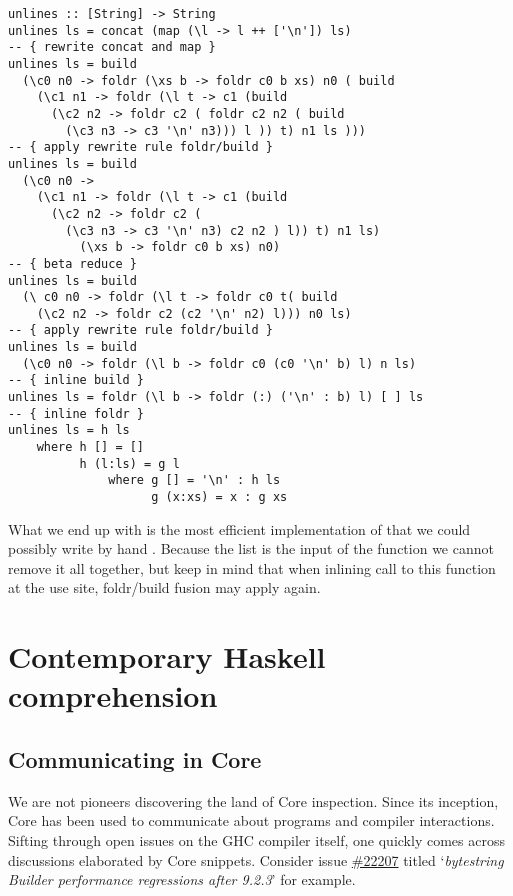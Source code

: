 \begin{listing}[H]
\begin{verbatim}
unlines :: [String] -> String
unlines ls = concat (map (\l -> l ++ ['\n']) ls)
-- { rewrite concat and map }
unlines ls = build
  (\c0 n0 -> foldr (\xs b -> foldr c0 b xs) n0 ( build
    (\c1 n1 -> foldr (\l t -> c1 (build
      (\c2 n2 -> foldr c2 ( foldr c2 n2 ( build
        (\c3 n3 -> c3 '\n' n3))) l )) t) n1 ls )))
-- { apply rewrite rule foldr/build }
unlines ls = build
  (\c0 n0 ->
    (\c1 n1 -> foldr (\l t -> c1 (build
      (\c2 n2 -> foldr c2 (
        (\c3 n3 -> c3 '\n' n3) c2 n2 ) l)) t) n1 ls)
          (\xs b -> foldr c0 b xs) n0)
-- { beta reduce }
unlines ls = build
  (\ c0 n0 -> foldr (\l t -> foldr c0 t( build
    (\c2 n2 -> foldr c2 (c2 '\n' n2) l))) n0 ls)
-- { apply rewrite rule foldr/build }
unlines ls = build
  (\c0 n0 -> foldr (\l b -> foldr c0 (c0 '\n' b) l) n ls)
-- { inline build }
unlines ls = foldr (\l b -> foldr (:) ('\n' : b) l) [ ] ls
-- { inline foldr }
unlines ls = h ls
    where h [] = []
          h (l:ls) = g l
              where g [] = '\n' : h ls
                    g (x:xs) = x : g xs
\end{verbatim}
\end{listing}

What we end up with is the most efficient implementation of  that we could possibly write by hand \cite{shortcut_fusion}.
Because the list  is the input of the function we cannot remove it all together, but keep in mind that when inlining call to this function
at the use site, foldr/build fusion may apply again. 

\section{Contemporary Haskell comprehension}

\subsection{Communicating in Core}
\label{section:communicating_core}

We are not pioneers discovering the land of Core inspection. Since its inception, Core has
been used to communicate about programs and compiler interactions. Sifting through open issues on the
GHC compiler itself, one quickly comes across discussions elaborated by Core snippets. Consider issue
\href{https://gitlab.haskell.org/ghc/ghc/-/issues/22207}{\#22207} titled `\textit{bytestring Builder performance regressions after 9.2.3}' for example.
\hfill \break

